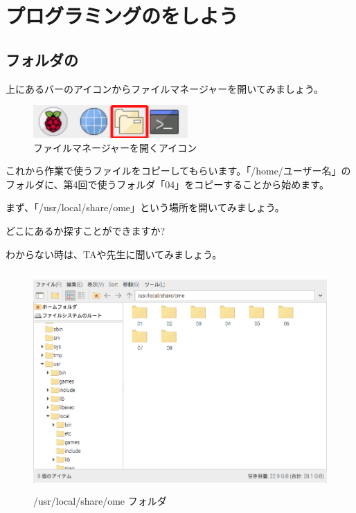 

\section{プログラミングのをしよう}

\subsection{フォルダの}
\bigskip
\bigskip

上にあるバーのアイコンからファイルマネージャーを開いてみましょう。


\begin{figure}[H]
  \begin{center}
    \includegraphics[keepaspectratio,width=5.898cm,height=1.242cm]{text04-img/text02-img001.png}
    \caption{ファイルマネージャーを開くアイコン}
  \end{center}
  \label{fig:prog_menu}
\end{figure}

これから作業で使うファイルをコピーしてもらいます。「/home/ユーザー名」のフォルダに、第4回で使うフォルダ「04」をコピーすることから始めます。

まず、「/usr/local/share/ome」という場所を開いてみましょう。

どこにあるか探すことができますか?

わからない時は、TAや先生に聞いてみましょう。


\begin{figure}[H]
  \begin{center}
    \includegraphics[keepaspectratio,width=11.232cm,height=8.424cm]{text04-img/s_ome04a.png}
    \caption{/usr/local/share/ome フォルダ}
  \end{center}
  \label{fig:prog_menu}
\end{figure}

